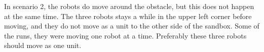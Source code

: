 In scenario 2, the robots do move around the obstacle, but this does not happen at the same time. The three robots stays a while in the upper left corner before moving, and they do not move as a unit to the other side of the sandbox. Some of the runs, they were moving one robot at a time. Preferably these three robots should move as one unit.




